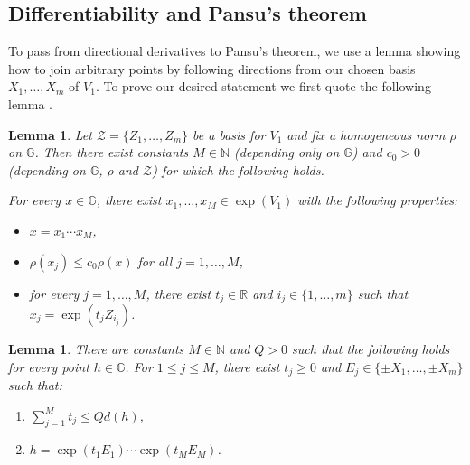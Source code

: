 \documentclass[reqno, 11pt]{amsart}
\newtheorem{lemma}[theorem]{Lemma}
\theoremstyle{definition}
\theoremstyle{remark}
\numberwithin{theorem}{section}
\numberwithin{equation}{section}
\begin{document}
\subsection{Differentiability and Pansu's theorem}

To pass from directional derivatives to Pansu's theorem, we use a lemma showing how to join arbitrary points by following directions from our chosen basis $X_{1}, \ldots, X_{m}$ of $V_{1}$. To prove our desired statement we first quote the following lemma \cite[Theorem 19.2.1]{BLU}.

\begin{lemma}\label{magiclemma}
Let $\mathcal{Z}=\{Z_{1}, \ldots, Z_{m}\}$ be a basis for $V_{1}$ and fix a homogeneous norm $\rho$ on $\mathbb{G}$. Then there exist constants $M\in \mathbb{N}$ (depending only on $\mathbb{G}$) and $c_{0}>0$ (depending on $\mathbb{G}$, $\rho$ and $\mathcal{Z}$) for which the following holds.

For every $x\in \mathbb{G}$, there exist $x_{1}, \ldots, x_{M}\in \exp(V_{1})$ with the following properties:
\begin{itemize}
\item $x=x_{1}\cdots x_{M}$,
\item $\rho(x_{j})\leq c_{0}\rho(x)$ for all $j=1, \ldots, M$,
\item for every $j=1,\ldots, M$, there exist $t_{j}\in \mathbb{R}$ and $i_{j}\in \{1, \ldots, m\}$ such that $x_{j}=\exp(t_{j}Z_{i_{j}})$.
\end{itemize}
\end{lemma}

\begin{lemma}\label{pathlemma}
There are constants $M\in \mathbb{N}$ and $Q>0$ such that the following holds for every point $h\in \mathbb{G}$. For $1\leq j\leq M$, there exist $t_{j} \geq 0$ and $E_{j}\in \{\pm X_{1}, \ldots, \pm X_{m}\}$ such that:
\begin{enumerate}
\item $\sum_{j=1}^{M} t_{j} \leq Qd(h)$,
\item $h=\exp(t_{1}E_{1}) \cdots \exp(t_{M}E_{M})$.
\end{enumerate}
\end{lemma}
\end{document}
